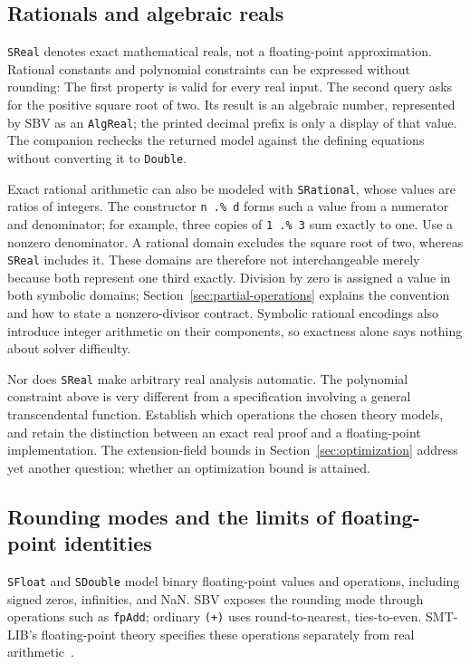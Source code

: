 \documentclass[review]{jfp-epi}
\newcommand{\code}[1]{\texttt{#1}}
\begin{document}
\subsection{Rationals and algebraic reals}
\label{sec:exact-arithmetic}

\code{SReal} denotes exact mathematical reals, not a floating-point approximation.
Rational constants and polynomial constraints can be expressed without rounding:
The first property is valid for every real input. The second query asks for the
positive square root of two. Its result is an algebraic number, represented by
SBV as an \code{AlgReal}; the printed decimal prefix is only a display of that
value. The companion rechecks the returned model against the defining equations
without converting it to \code{Double}.

Exact rational arithmetic can also be modeled with \code{SRational}, whose
values are ratios of integers. The constructor \code{n .\% d} forms such a
value from a numerator and denominator; for example, three copies of
\code{1 .\% 3} sum exactly to one. Use a nonzero denominator. A rational domain
excludes the square root of two, whereas \code{SReal} includes it. These domains
are therefore not interchangeable merely because both represent one third
exactly. Division by zero is assigned a value in both symbolic domains;
Section~\ref{sec:partial-operations} explains the convention and how to state
a nonzero-divisor contract. Symbolic rational encodings also introduce integer arithmetic on their
components, so exactness alone says nothing about solver difficulty.

Nor does \code{SReal} make arbitrary real analysis automatic. The polynomial
constraint above is very different from a specification involving a general
transcendental function. Establish which operations the chosen theory models,
and retain the distinction between an exact real proof and a floating-point
implementation. The extension-field bounds in Section~\ref{sec:optimization}
address yet another question: whether an optimization bound is attained.


\subsection{Rounding modes and the limits of floating-point identities}
\label{sec:floating-point}

\code{SFloat} and \code{SDouble} model binary floating-point values and
operations, including signed zeros, infinities, and NaN. SBV exposes the
rounding mode through operations such as \code{fpAdd}; ordinary \code{(+)}
uses round-to-nearest, ties-to-even. SMT-LIB's floating-point theory specifies
these operations separately from real arithmetic~\citep{smtfloatingpoint}.
\end{document}

